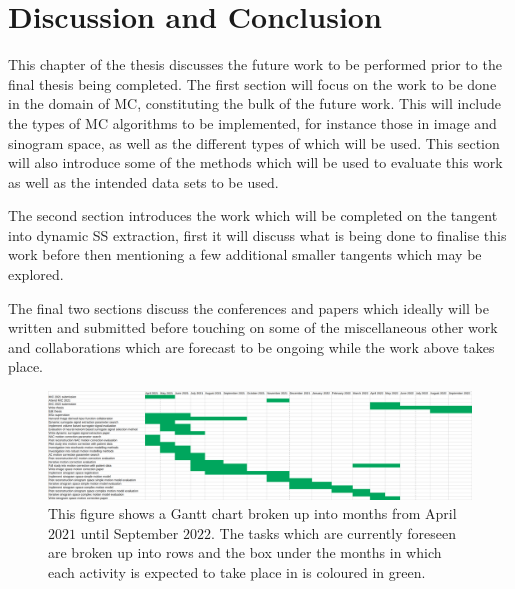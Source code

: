 \chapter{Discussion and Conclusion} \label{sec:discussion_and_conclusion}
    \newpage
    
        This chapter of the thesis discusses the future work to be performed prior to the final thesis being completed. The first section will focus on the work to be done in the domain of \gls{MC}, constituting the bulk of the future work. This will include the types of \gls{MC} algorithms to be implemented, for instance those in image and sinogram space, as well as the different types of  which will be used. This section will also introduce some of the methods which will be used to evaluate this work as well as the intended data sets to be used.
        
        The second section introduces the work which will be completed on the tangent into dynamic \gls{SS} extraction, first it will discuss what is being done to finalise this work before then mentioning a few additional smaller tangents which may be explored.
        
        The final two sections discuss the conferences and papers which ideally will be written and submitted before touching on some of the miscellaneous other work and collaborations which are forecast to be ongoing while the work above takes place.
    
        \begin{figure}
            \centering
                
            \includegraphics[width=1.0\linewidth]{figures/future_work_gantt_chart.png}
                
            \captionsetup{singlelinecheck=false, justification=centering}
            \caption{This figure shows a Gantt chart broken up into months from April $2021$ until September $2022$. The tasks which are currently foreseen are broken up into rows and the box under the months in which each activity is expected to take place in is coloured in green.}
            \label{fig:future_work_gantt_chart}
        \end{figure}
        
